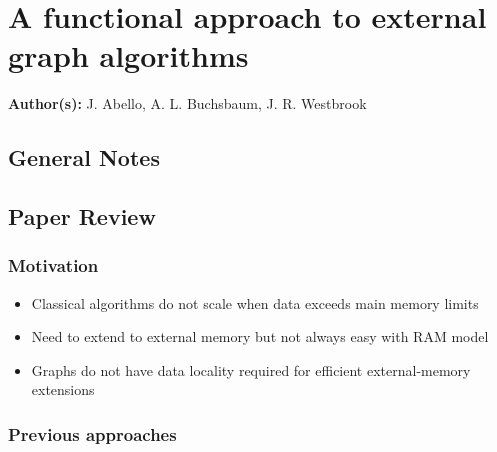 \section{A functional approach to external graph algorithms}

\textbf{Author(s):} J. Abello, A. L. Buchsbaum, J. R. Westbrook

\subsection{General Notes}


\subsection{Paper Review}

\subsubsection{Motivation}

\begin{itemize}
    \item Classical algorithms do not scale when data exceeds main memory limits
    \item Need to extend to external memory but not always easy with RAM model 
    \item Graphs do not have data locality required for efficient external-memory extensions
\end{itemize}

\subsubsection{Previous approaches}

